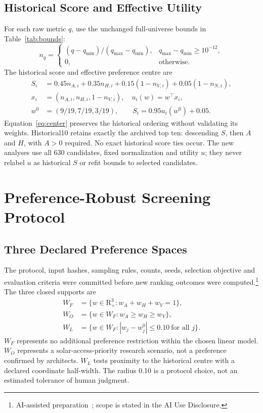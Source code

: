 \documentclass{llncs}
\newcommand{\aidraft}{\footnote{AI-assisted preparation~\cite{openai2026}; scope is stated in the AI Use Disclosure.}}
\begin{document}
\subsection{Historical Score and Effective Utility}
For each raw metric $q$, use the unchanged full-universe bounds in Table~\ref{tab:bounds}:
\begin{equation}
 n_q=\begin{cases}(q-q_{\min})/(q_{\max}-q_{\min}),&q_{\max}-q_{\min}\geq10^{-12},\\0,&\text{otherwise}.\end{cases}
\label{eq:normalization}
\end{equation}
The historical score and effective preference centre are
\begin{align}
 S_i&=0.45n_{A,i}+0.35n_{H,i}+0.15(1-n_{V,i})+0.05(1-n_{N,i}),\label{eq:historical}\\
 x_i&=(n_{A,i},n_{H,i},1-n_{V,i}),\quad u_i(w)=w^\top x_i,\label{eq:utility}\\
 w^0&=(9/19,7/19,3/19),\qquad S_i=0.95u_i(w^0)+0.05.\label{eq:center}
\end{align}
Equation~\ref{eq:center} preserves the historical ordering without validating its weights. Historical10 retains exactly the archived top ten: descending $S$, then $A$ and $H$, with $A>0$ required. No exact historical score ties occur. The new analyses use all 630 candidates, fixed normalization and utility $u$; they never relabel $u$ as historical $S$ or refit bounds to selected candidates.

\section{Preference-Robust Screening Protocol}
\subsection{Three Declared Preference Spaces}
The protocol, input hashes, sampling rules, counts, seeds, selection objective and evaluation criteria were committed before new ranking outcomes were computed.\aidraft{} The three closed supports are
\begin{align}
 W_F&=\{w\in\mathrm{R}_+^3:w_A+w_H+w_V=1\},\label{eq:full}\\
 W_O&=\{w\in W_F:w_A\geq w_H\geq w_V\},\label{eq:ordered}\\
 W_L&=\{w\in W_F:|w_j-w_j^0|\leq0.10\ \text{for all }j\}.\label{eq:local}
\end{align}
$W_F$ represents no additional preference restriction within the chosen linear model. $W_O$ represents a solar-access-priority research scenario, not a preference confirmed by architects. $W_L$ tests proximity to the historical centre with a declared coordinate half-width. The radius 0.10 is a protocol choice, not an estimated tolerance of human judgment.
\end{document}
